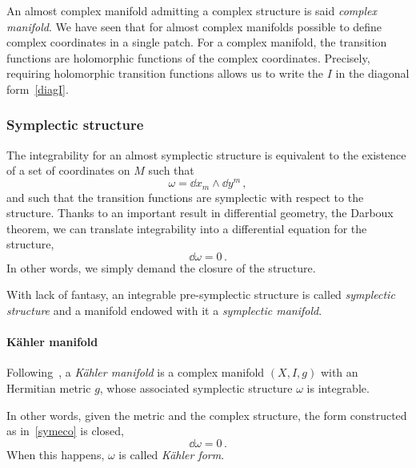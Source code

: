 \documentclass[debug]{phd}
\begin{document}
						An almost complex manifold admitting a complex structure is said \emph{complex manifold}.
						We have seen that for almost complex manifolds possible to define complex coordinates in a single patch.
						For a complex manifold, the transition functions are holomorphic functions of the complex coordinates.
						Precisely, requiring holomorphic transition functions allows us to write the $I$ in the diagonal form~\eqref{diagI}.
				\subsubsection{Symplectic structure}
						The integrability for an almost symplectic structure is equivalent to the existence of a set of coordinates on $M$ such that
								\begin{equation}
									\omega = \dd x_m \wedge \dd y^m\, ,
								\end{equation}
						and such that the transition functions are symplectic with respect to the structure.
						Thanks to an important result in differential geometry, the Darboux theorem, we can translate integrability into a differential equation for the structure,
								\begin{equation}
									\dd \omega = 0\, .
								\end{equation}
						In other words, we simply demand the closure of the structure.
						
						With lack of fantasy, an integrable pre-symplectic structure is called \emph{symplectic structure} and a manifold endowed with it a \emph{symplectic manifold}.
						
					\paragraph{K\"ahler manifold} Following~\cite{KahlBook}, a \emph{K\"ahler manifold} is a complex manifold $(X, I, g)$ with an Hermitian metric $g$, whose associated symplectic structure $\omega$ is integrable.
					
					In other words, given the metric and the complex structure, the form constructed as in~\eqref{symeco} is closed,
							\begin{equation}
								\dd \omega = 0\, .
							\end{equation}
					When this happens, $\omega$ is called \emph{K\"ahler form}.
\end{document}
